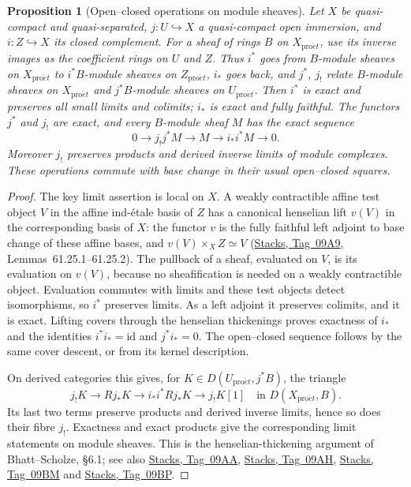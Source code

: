 \documentclass[11pt,a4paper]{article}
\numberwithin{equation}{section}
\newtheorem{proposition}[theorem]{Proposition}
\theoremstyle{definition}
\theoremstyle{remark}
\newcommand{\proet}{\mathrm{pro}\acute{e}t}
\newcommand{\stacks}[1]{\href{https://stacks.math.columbia.edu/tag/#1}{\textnormal{Stacks, Tag~#1}}}
\begin{document}
\begin{proposition}[Open--closed operations on module sheaves]
\label{pe:open-closed}
Let $X$ be quasi-compact and quasi-separated, $j:U\hookrightarrow X$
a quasi-compact open immersion, and $i:Z\hookrightarrow X$ its
closed complement. For a sheaf of rings $B$ on $X_{\proet}$, use its
inverse images as the coefficient rings on $U$ and $Z$. Thus
$i^*$ goes from $B$-module sheaves on $X_{\proet}$ to $i^*B$-module
sheaves on $Z_{\proet}$, $i_*$ goes back, and $j^*$, $j_!$ relate
$B$-module sheaves on $X_{\proet}$ and $j^*B$-module sheaves on
$U_{\proet}$.
Then $i^*$ is exact and preserves all small limits and colimits;
$i_*$ is exact and fully faithful. The functors $j^*$ and $j_!$ are
exact, and every $B$-module sheaf $M$ has the exact sequence
\[
 0\longrightarrow j_!j^*M\longrightarrow M
   \longrightarrow i_*i^*M\longrightarrow0.
\]
Moreover $j_!$ preserves products and derived inverse limits of
module complexes. These operations commute with base change in
their usual open--closed squares.
\end{proposition}
\begin{proof}
The key limit assertion is local on $X$. A weakly contractible affine
test object $V$ in the affine ind-\'etale basis of $Z$ has a canonical
henselian lift $v(V)$ in the corresponding basis of $X$: the functor
$v$ is the fully faithful left adjoint to base change of these affine
bases, and $v(V)\times_XZ\simeq V$ (\stacks{09A9},
Lemmas~61.25.1--61.25.2). The pullback of a sheaf, evaluated on $V$,
is its evaluation on $v(V)$, because no sheafification is needed on a
weakly contractible object. Evaluation commutes with limits and these
test objects detect isomorphisms, so $i^*$ preserves limits. As a left
adjoint it preserves colimits, and it is exact. Lifting covers through
the henselian thickenings proves exactness of $i_*$ and the identities
$i^*i_*=\mathrm{id}$ and $j^*i_*=0$. The open--closed sequence follows
by the same cover descent, or from its kernel description.

On derived categories this gives, for $K\in D(U_{\proet},j^*B)$, the
triangle
\[
 j_!K\longrightarrow Rj_*K\longrightarrow i_*i^*Rj_*K
       \longrightarrow j_!K[1]\quad\text{in }D(X_{\proet},B).
\]
Its last two terms preserve products and derived inverse limits, hence
so does their fibre $j_!$. Exactness and exact products give the
corresponding limit statements on module sheaves. This is the
henselian-thickening argument of Bhatt--Scholze, \S6.1; see also
\stacks{09AA}, \stacks{09AH}, \stacks{09BM} and \stacks{09BP}.
\end{proof}
\end{document}
